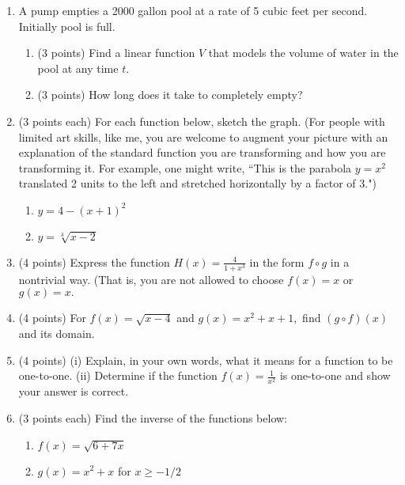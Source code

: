 \documentclass[11pt]{article}
\begin{document}
\begin{enumerate}
\item A pump empties a 2000 gallon pool at a rate of 5 cubic feet per second. Initially pool is full. \begin{enumerate}
\item (3 points) Find a linear function $V$ that models the volume of water in the pool at any time $t.$
\vspace{1in}
\item (3 points) How long does it take to completely empty?
\vspace{1in}
\end{enumerate}
\item (3 points each) For each function below, sketch the graph. (For people with limited art skills, like me, you are welcome to augment your picture with an explanation of the standard function you are transforming and how you are transforming it. For example, one might write, ``This is the parabola $y=x^2$ translated 2 units to the left and stretched horizontally by a factor of 3.")
\begin{enumerate}
\item $y=4-(x+1)^2$
\vfill
\item $y=\sqrt[3]{x-2}$
\vfill
\end{enumerate}
\item (4 points) Express the function $H(x)=\frac{4}{1+x^3}$ in the form $f \circ g$ in a nontrivial way. (That is, you are not allowed to choose $f(x)=x$ or $g(x)=x.$
\vspace{.75in}
\newpage
\item (4 points) For $f(x)=\sqrt{x-4}$ and $g(x)=x^2+x+1,$ find $(g \circ f)(x)$ and its domain.
\vfill
\item (4 points) (i) Explain, in your own words, what it means for a function to be one-to-one. (ii) Determine if the function $f(x)=\frac{1}{x^2}$ is one-to-one and show your answer is correct. 
\vfill
\item (3 points each) Find the inverse of the functions below: 
\begin{enumerate}
\item $f(x)=\sqrt{6+7x}$
\vfill
\item $g(x)=x^2+x$ for $x \geq -1/2$
\vfill
\end{enumerate}
\end{enumerate}
\end{document}
